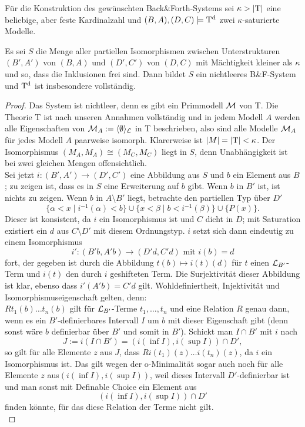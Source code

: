 \newpage
Für die Konstruktion des gewünschten Back\&Forth-Systems sei $\kappa>{\left| \operatorname{T} \right|}$ eine beliebige, aber feste Kardinalzahl und $(B,A),(D,C)\models\operatorname{T^d}$ zwei $\kappa$-saturierte Modelle.
\begin{theorem}\label{BackForth}
	Es sei $S$ die Menge aller partiellen Isomorphismen zwischen Unterstrukturen $(B',A')$ von $(B,A)$ und $(D',C')$ von $(D,C)$ mit Mächtigkeit kleiner als $\kappa$ und so, dass die Inklusionen frei sind. Dann bildet $S$ ein nichtleeres B\&F-System und $\operatorname{T^d}$ ist insbesondere vollständig.
\end{theorem}
\begin{proof}
	Das System ist nichtleer, denn es gibt ein Primmodell $\mathcal{M}$ von T. Die Theorie T ist nach unseren Annahmen vollständig und in jedem Modell $A$ werden alle Eigenschaften von $\mathcal{M}_A:=\langle\emptyset\rangle_{\mathcal{L}}$ in T beschrieben, also sind alle Modelle $\mathcal{M}_A$ für jedes Modell $A$ paarweise isomorph. Klarerweise ist ${\left| M \right|}={\left| \operatorname{T} \right|}<\kappa$. Der Isomorphismus $(M_A,M_A)\cong(M_C,M_C)$ liegt in $S$, denn Unabhängigkeit ist bei zwei gleichen Mengen offensichtlich.\\
	Sei jetzt $i:(B',A')\rightarrow(D',C')$ eine Abbildung aus $S$ und $b$ ein Element aus $B$; zu zeigen ist, dass es in $S$ eine Erweiterung auf $b$ gibt. Wenn $b$ in $B'$ ist, ist nichts zu zeigen. Wenn $b$ in $A\setminus B'$ liegt, betrachte den partiellen Typ über $D'$ $$\{\alpha<x\mid i^{-1}(\alpha)<b\}\cup\{x<\beta\mid b<i^{-1}(\beta)\}\cup\{P(x)\}.$$
	Dieser ist konsistent, da $i$ ein Isomorphismus ist und $C$ dicht in $D$; mit Saturation existiert ein $d$ aus $C\setminus D'$ mit diesem Ordnungstyp. $i$ setzt sich dann eindeutig zu einem Isomorphismus $$i':(B'b,A'b)\rightarrow(D'd,C'd)\text{ mit }i(b)=d$$ fort, der gegeben ist durch die Abbildung $t(b)\mapsto i(t)(d)$ für $t$ einen $\mathcal{L}_{B'}$-Term und $i(t)$ den durch $i$ geshifteten Term. Die Surjektivität dieser Abbildung ist klar, ebenso dass $i'(A'b)=C'd$ gilt. Wohldefiniertheit, Injektivität und Isomorphismuseigenschaft gelten, denn:\\
	$Rt_1(b)\dots t_n(b)$ gilt für $\mathcal{L}_{B'}$-Terme $t_1,\dots,t_n$ und eine Relation $R$ genau dann, wenn es ein $B'$-definierbares Intervall $I$ um $b$ mit dieser Eigenschaft gibt (denn sonst wäre $b$ definierbar über $B'$ und somit in $B'$). Schickt man $I\cap B'$ mit $i$ nach $$J:=i(I\cap B')=(i(\inf I),i(\sup I))\cap D',$$ so gilt für alle Elemente $z$ aus $J$, dass $Ri(t_1)(z)\dots i(t_n)(z)$, da $i$ ein Isomorphismus ist.\newpage
	Das gilt wegen der o-Minimalität sogar auch noch für alle Elemente $z$ aus\linebreak $(i(\inf I),i(\sup I))$, weil dieses Intervall $D'$-definierbar ist und man sonst mit Definable Choice ein Element aus $$(i(\inf I),i(\sup I))\cap D'$$ finden könnte, für das diese Relation der Terme nicht gilt.\\

\end{proof}
